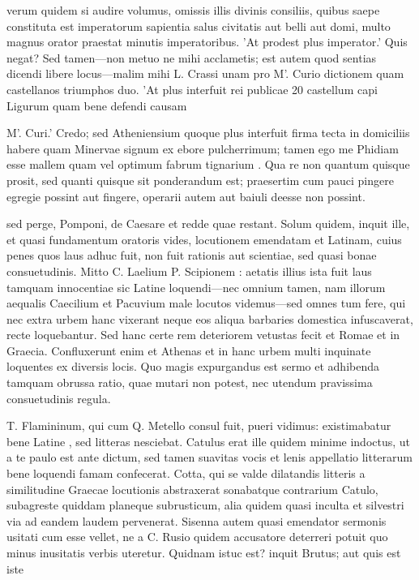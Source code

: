  verum quidem si audire volumus, omissis illis divinis consiliis, quibus saepe constituta est imperatorum sapientia salus civitatis aut belli aut domi, multo magnus orator praestat minutis imperatoribus. 'At prodest plus imperator.' Quis negat? Sed tamen—non metuo ne mihi acclametis; est autem quod sentias dicendi libere locus—malim mihi L. Crassi unam pro M'. Curio dictionem quam castellanos triumphos duo. 'At plus interfuit rei publicae 20 castellum capi Ligurum quam bene defendi causam

 M'. Curi.' Credo; sed Atheniensium quoque plus interfuit firma tecta in domiciliis habere quam Minervae signum ex ebore pulcherrimum; tamen ego me Phidiam esse mallem quam vel optimum fabrum tignarium . Qua re non quantum quisque prosit, sed quanti quisque sit ponderandum est; praesertim cum pauci pingere egregie possint aut fingere, operarii autem aut baiuli deesse non possint.

 sed perge, Pomponi, de Caesare et redde quae restant. Solum quidem, inquit ille, et quasi fundamentum oratoris vides, locutionem emendatam et Latinam, cuius penes quos laus adhuc fuit, non fuit rationis aut scientiae, sed quasi bonae consuetudinis. Mitto C. Laelium P. Scipionem : aetatis illius ista fuit laus tamquam innocentiae sic Latine loquendi—nec omnium tamen, nam illorum aequalis Caecilium et Pacuvium male locutos videmus—sed omnes tum fere, qui nec extra urbem hanc vixerant neque eos aliqua barbaries domestica infuscaverat, recte loquebantur. Sed hanc certe rem deteriorem vetustas fecit et Romae et in Graecia. Confluxerunt enim et Athenas et in hanc urbem multi inquinate loquentes ex diversis locis. Quo magis expurgandus est sermo et adhibenda tamquam obrussa ratio, quae mutari non potest, nec utendum pravissima consuetudinis regula.

 T. Flamininum, qui cum Q. Metello consul fuit, pueri vidimus: existimabatur bene Latine , sed litteras nesciebat. Catulus erat ille quidem minime indoctus, ut a te paulo est ante dictum, sed tamen suavitas vocis et lenis appellatio litterarum bene loquendi famam confecerat. Cotta, qui se valde dilatandis litteris a similitudine Graecae locutionis abstraxerat sonabatque contrarium Catulo, subagreste quiddam planeque subrusticum, alia quidem quasi inculta et silvestri via ad eandem laudem pervenerat. Sisenna autem quasi emendator sermonis usitati cum esse vellet, ne a C. Rusio quidem accusatore deterreri potuit quo minus inusitatis verbis uteretur. Quidnam istuc est? inquit Brutus; aut quis est iste


